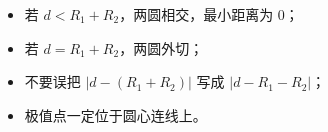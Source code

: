\begin{trapbox}
\begin{itemize}
  \item 若 $d<R_1+R_2$，两圆相交，最小距离为 $0$；
  \item 若 $d=R_1+R_2$，两圆外切；
  \item 不要误把 $|d-(R_1+R_2)|$ 写成 $|d-R_1-R_2|$；
  \item 极值点一定位于圆心连线上。
\end{itemize}
\end{trapbox}
